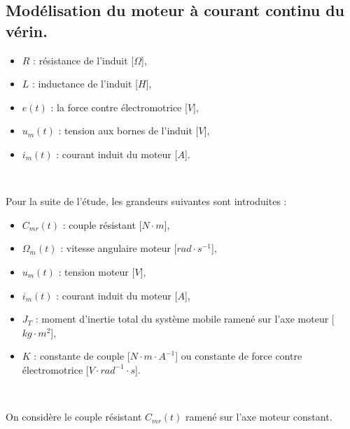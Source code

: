 

\subsection{Modélisation du moteur à courant continu du vérin.}


\begin{itemize}
 \item $R$ : résistance de l’induit [$\Omega$],
 \item $L$ : inductance de l’induit [$H$],
 \item $e(t)$ : la force contre électromotrice [$V$],
 \item $u_m(t)$ : tension aux bornes de l’induit [$V$],
 \item $i_m(t)$ : courant induit du moteur [$A$].
\end{itemize}


~\

Pour la suite de l’étude, les grandeurs suivantes sont introduites :
\begin{itemize}
 \item $C_{mr}(t)$ : couple résistant [$N\cdot m$],
 \item $\Omega_m(t)$ : vitesse angulaire moteur [$rad\cdot s^{-1}$],
 \item $u_m(t)$ : tension moteur [$V$],
 \item $i_m (t)$ : courant induit du moteur [$A$],
 \item $J_T$ : moment d’inertie total du système mobile ramené sur l’axe moteur [$kg\cdot m^2$],
 \item $K$ : constante de couple [$N\cdot m\cdot A^{-1}$] ou constante de force contre électromotrice [$V\cdot rad^{-1}\cdot s$].
\end{itemize}

~\

On considère le couple résistant $C_{mr}(t)$ ramené sur l’axe moteur constant.

